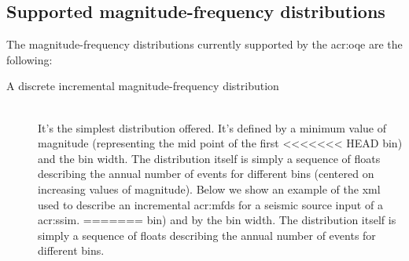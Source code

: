 \subsection{Supported magnitude-frequency distributions}
\label{sec:mfd}
The magnitude-frequency distributions currently supported by the 
\gls{acr:oqe} are the following: 
\begin{description}
    \item[A discrete incremental magnitude-frequency distribution] \hfill \\
    It's the simplest distribution offered. It's defined by a 
    minimum value of magnitude (representing the mid point of the first
<<<<<<< HEAD
    bin) and the bin width. The distribution itself is simply a 
    sequence of floats describing the annual number of events for 
    different bins (centered on increasing values of magnitude). 
    Below we show an example of the xml used to describe an incremental 
    \glspl{acr:mfd} for a seismic source input of a \gls{acr:ssim}.
=======
    bin) and by the bin width. The distribution itself is simply a 
    sequence of floats describing the annual number of events for 
    different bins. 


\end{description}
